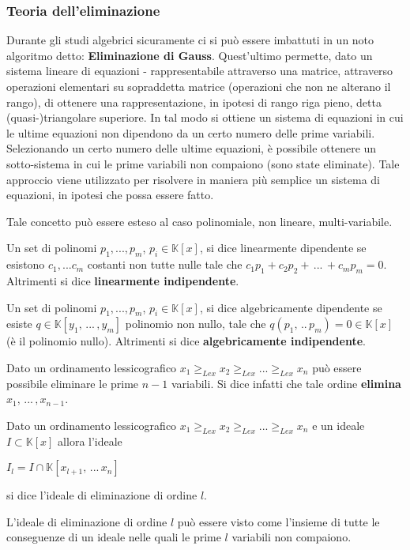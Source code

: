 \subsubsection{Teoria dell'eliminazione}
Durante gli studi algebrici sicuramente ci si può essere imbattuti in un noto algoritmo detto: \textbf{Eliminazione di Gauss}. Quest'ultimo permette, dato un sistema lineare di equazioni - rappresentabile attraverso una matrice, attraverso operazioni elementari su sopraddetta matrice (operazioni che non ne alterano il rango), di ottenere una rappresentazione, in ipotesi di rango riga pieno, detta (quasi-)triangolare superiore. In tal modo si ottiene un sistema di equazioni in cui le ultime equazioni non dipendono da un certo numero delle prime variabili. Selezionando un certo numero delle ultime equazioni, è possibile ottenere un sotto-sistema in cui le prime variabili non compaiono (sono state eliminate). 
Tale approccio viene utilizzato per risolvere in maniera più semplice un sistema di equazioni, in ipotesi che possa essere fatto.

Tale concetto può essere esteso al caso polinomiale, non lineare, multi-variabile.

\begin{defn}
	Un set di polinomi $p_1, ..., p_m$, $p_i \in \mathbb{K}[x]$, si dice linearmente dipendente se esistono $c_1, ... c_m$ costanti non tutte nulle tale che $c_1p_1 + c_2p_2 + \, ... \, + c_mp_m = 0$. Altrimenti si dice \textbf{linearmente indipendente}.
	
	Un set di polinomi $p_1, ..., p_m$, $p_i \in \mathbb{K}[x]$, si dice algebricamente dipendente se esiste $q \in \mathbb{K}[y_1, \, ... \, , y_m]$ polinomio non nullo, tale che  $q(p_1, \, ..\, p_m) = 0 \in \mathbb{K}[x]$ (è il polinomio nullo). Altrimenti si dice \textbf{algebricamente indipendente}.
\end{defn}

Dato un ordinamento lessicografico $x_1 \ge_{Lex} x_2 \ge_{Lex} ... \ge_{Lex} x_n$ può essere possibile eliminare le prime $n-1$ variabili. Si dice infatti che tale ordine \textbf{elimina} $x_1, \, ... \, , x_{n-1}$.

\begin{defn}
	Dato un ordinamento lessicografico $x_1 \ge_{Lex} x_2 \ge_{Lex} ... \ge_{Lex} x_n$ e un ideale $I \subset \mathbb{K}[x]$ allora l'ideale
	\begin{center}
		$I_l = I \cap \mathbb{K}[x_{l+1}, \, ... \, x_{n}]$
	\end{center}
	si dice l'ideale di eliminazione di ordine $l$.
\end{defn} 
L'ideale di eliminazione di ordine $l$ può essere visto come l'insieme di tutte le conseguenze di un ideale nelle quali le prime $l$ variabili non compaiono.

